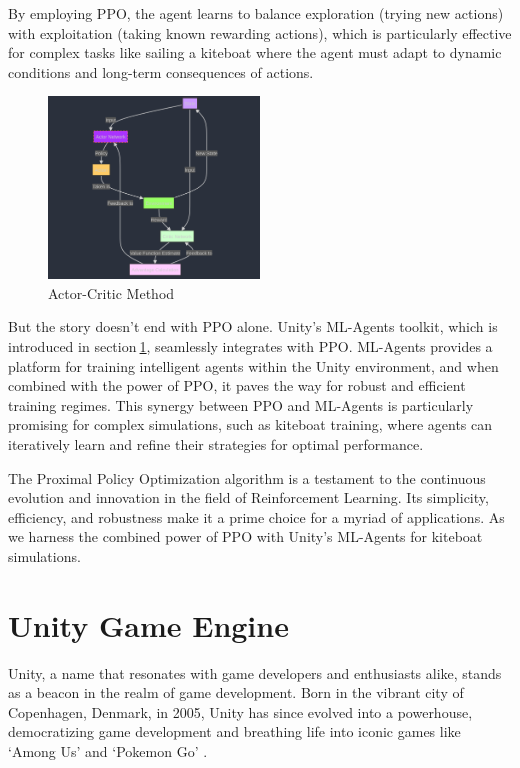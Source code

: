 By employing PPO, the agent learns to balance exploration (trying new actions) with exploitation (taking known rewarding actions), which is particularly effective for complex tasks like sailing a kiteboat where the agent must adapt to dynamic conditions and long-term consequences of actions.

\begin{figure}
    \centering
    \includegraphics[width=0.5\textwidth]{Images/ppo_explanation.png}
    \caption{Actor-Critic Method}\label{actor_critic}
\end{figure}

But the story doesn't end with PPO alone. Unity's ML-Agents toolkit, which is introduced in section$~$\ref{unity}, seamlessly integrates with PPO. ML-Agents provides a platform for training intelligent agents within the Unity environment, and when combined with the power of PPO, it paves the way for robust and efficient training regimes. This synergy between PPO and ML-Agents is particularly promising for complex simulations, such as kiteboat training, where agents can iteratively learn and refine their strategies for optimal performance.

The Proximal Policy Optimization algorithm is a testament to the continuous evolution and innovation in the field of Reinforcement Learning. Its simplicity, efficiency, and robustness make it a prime choice for a myriad of applications. As we harness the combined power of PPO with Unity's ML-Agents for kiteboat simulations.




\section{Unity Game Engine}\label{unity}

Unity, a name that resonates with game developers and enthusiasts alike, stands as a beacon in the realm of game development. Born in the vibrant city of Copenhagen, Denmark, in 2005, Unity has since evolved into a powerhouse, democratizing game development and breathing life into iconic games like `Among Us' and `Pokemon Go' \cite{unity100seconds}.

